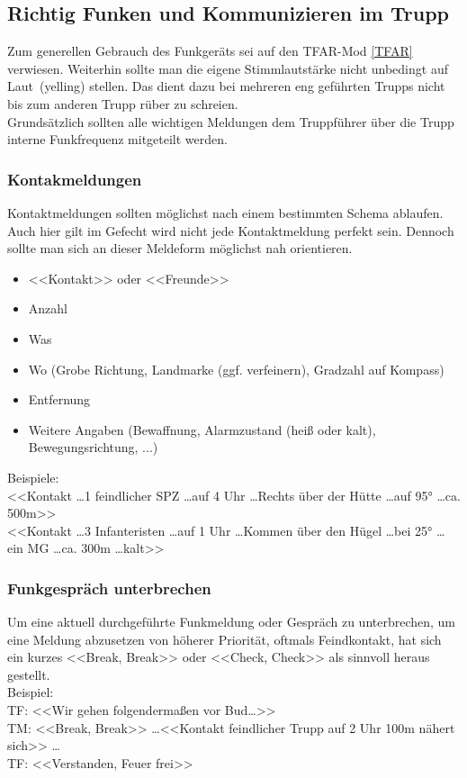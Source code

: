 \newpage
\subsection{Richtig Funken und Kommunizieren im Trupp}

	Zum generellen Gebrauch des Funkgeräts sei auf den TFAR-Mod \autoref{TFAR} verwiesen. Weiterhin sollte man die eigene Stimmlautstärke nicht unbedingt auf \glqq Laut\grqq\, (\glqq yelling\grqq) stellen. Das dient dazu bei mehreren eng geführten Trupps nicht bis zum anderen Trupp rüber zu schreien.\\
	Grundsätzlich sollten alle wichtigen Meldungen dem Truppführer über die Trupp interne Funkfrequenz mitgeteilt werden.\\

\subsubsection{Kontakmeldungen}
	Kontaktmeldungen  sollten möglichst nach einem bestimmten Schema ablaufen.  Auch hier gilt im Gefecht wird nicht jede Kontaktmeldung perfekt sein. Dennoch sollte man sich an dieser Meldeform möglichst nah orientieren.
		\begin{itemize}
		\item <<Kontakt>> oder <<Freunde>>
		\item Anzahl 
		\item Was
		\item Wo (Grobe Richtung, Landmarke (ggf. verfeinern), Gradzahl auf Kompass) 
		\item Entfernung
		\item Weitere Angaben (Bewaffnung, Alarmzustand (heiß oder kalt), Bewegungsrichtung, ...)
	\end{itemize}

	Beispiele:\\
	<<Kontakt \dots 1 feindlicher \acs{SPZ} \dots auf 4 Uhr \dots Rechts über der Hütte \dots auf 95° \dots ca. 500m>> \\
	<<Kontakt \dots 3 Infanteristen \dots auf 1 Uhr \dots Kommen über den Hügel \dots bei 25° \dots ein \acs{MG} \dots ca. 300m \dots kalt>> \\

\subsubsection{Funkgespräch unterbrechen}
	Um eine aktuell durchgeführte Funkmeldung oder Gespräch zu unterbrechen, um eine Meldung abzusetzen von höherer Priorität, oftmals Feindkontakt, hat sich ein kurzes <<Break, Break>> oder <<Check, Check>> als sinnvoll heraus gestellt. \\
	Beispiel: \\
	TF: <<Wir gehen folgendermaßen vor Bud…>>  \\
	TM: <<Break, Break>> \dots <<Kontakt feindlicher Trupp auf 2 Uhr  100m nähert sich>> \dots  \\
	TF: <<Verstanden, Feuer frei>> \\

